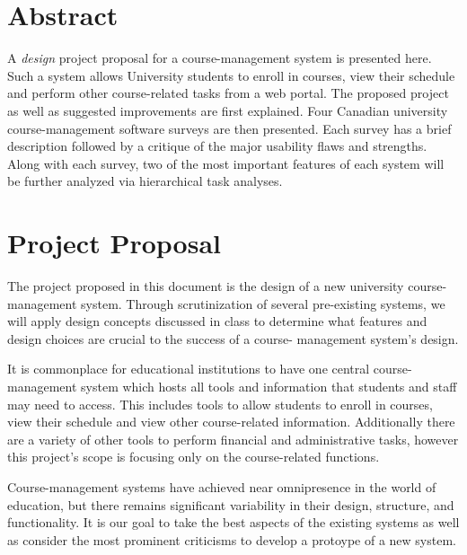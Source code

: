 \documentclass[10pt]{article}
\begin{document}
\begin{multicols}{2}

\section*{Abstract}
A \emph{design} project proposal for a course-management system is presented 
here. Such a system allows University students to enroll in courses, view their 
schedule and perform other course-related tasks from a web portal. The proposed 
project as well as suggested improvements are first explained. Four Canadian 
university course-management software surveys are then presented. Each survey 
has a brief description followed by a critique of the major usability flaws and 
strengths. Along with each survey, two of the most important features of each 
system will be further analyzed via hierarchical task analyses. 

\section*{Project Proposal}

The project proposed in this document is the design of a new 
university course-management system. Through scrutinization of several 
pre-existing systems, we will apply design concepts discussed in class to 
determine what features and design choices are crucial to the success of a course-
management system's design.

It is commonplace for educational institutions to have one central course-
management system which hosts all tools and information that students and staff 
may need to access. This includes tools to allow students to enroll in courses, 
view their schedule and view other course-related information. Additionally 
there are a variety of other tools to perform financial and administrative 
tasks, however this project's scope is focusing only on the course-related 
functions.

Course-management systems have achieved near omnipresence in 
the world of education, but there remains significant variability in their design, 
structure, and functionality. It is our goal to take the best aspects of the 
existing systems as well as consider the most prominent criticisms to develop a protoype of a new system.


\end{multicols}
\end{document}
